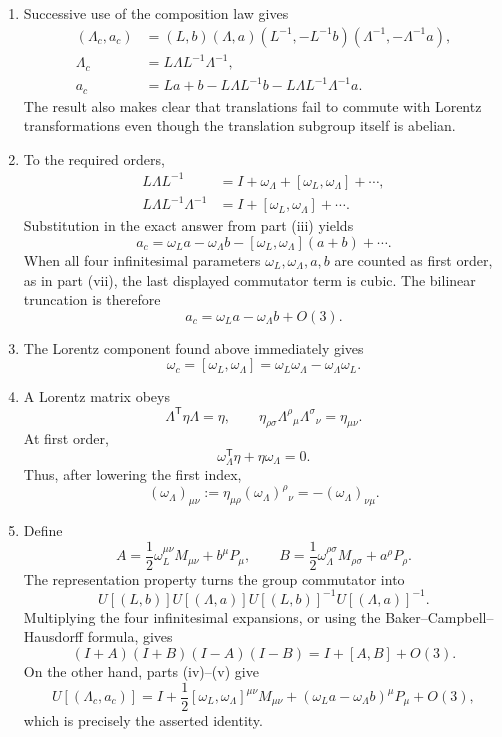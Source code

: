 \begin{enumerate}
\begin{enumerate}
\item[(iii)] Successive use of the composition law gives
\[
\begin{split}
 (\Lambda_c,a_c)
 &=(L,b)(\Lambda,a)(L^{-1},-L^{-1}b)
   (\Lambda^{-1},-\Lambda^{-1}a),\\
 \Lambda_c&=L\Lambda L^{-1}\Lambda^{-1},\\
 a_c&=La+b-L\Lambda L^{-1}b
      -L\Lambda L^{-1}\Lambda^{-1}a.
\end{split}
\]
The result also makes clear that translations fail to commute with
Lorentz transformations even though the translation subgroup itself is
abelian.

\item[(iv)] To the required orders,
\[
\begin{aligned}
 L\Lambda L^{-1}
 &=I+\omega_\Lambda+[\omega_L,\omega_\Lambda]+\cdots,\\
 L\Lambda L^{-1}\Lambda^{-1}
 &=I+[\omega_L,\omega_\Lambda]+\cdots.
\end{aligned}
\]
Substitution in the exact answer from part (iii) yields
\[
 a_c=\omega_La-\omega_\Lambda b
 -[\omega_L,\omega_\Lambda](a+b)+\cdots.
\]
When all four infinitesimal parameters \(\omega_L,\omega_\Lambda,a,b\)
are counted as first order, as in part (vii), the last displayed
commutator term is cubic.  The bilinear truncation is therefore
\[
 a_c=\omega_La-\omega_\Lambda b+O(3).
\]

\item[(v)] The Lorentz component found above immediately gives
\[
 \omega_c=[\omega_L,\omega_\Lambda]
 =\omega_L\omega_\Lambda-\omega_\Lambda\omega_L.
\]

\item[(vi)] A Lorentz matrix obeys
\[
 \Lambda^{\mathsf T}\eta\Lambda=\eta,
 \qquad
 \eta_{\rho\sigma}\Lambda^\rho{}_{\mu}
 \Lambda^\sigma{}_{\nu}=\eta_{\mu\nu}.
\]
At first order,
\[
 \omega_\Lambda^{\mathsf T}\eta+\eta\omega_\Lambda=0.
\]
Thus, after lowering the first index,
\[
 (\omega_\Lambda)_{\mu\nu}
 :=\eta_{\mu\rho}(\omega_\Lambda)^\rho{}_{\nu}
 =-(\omega_\Lambda)_{\nu\mu}.
\]

\item[(vii)] Define
\[
 A=\frac12\omega_L^{\mu\nu}M_{\mu\nu}+b^\mu P_\mu,
 \qquad
 B=\frac12\omega_\Lambda^{\rho\sigma}M_{\rho\sigma}+a^\rho P_\rho.
\]
The representation property turns the group commutator into
\[
 U[(L,b)]U[(\Lambda,a)]U[(L,b)]^{-1}U[(\Lambda,a)]^{-1}.
\]
Multiplying the four infinitesimal expansions, or using the
Baker--Campbell--Hausdorff formula, gives
\[
 (I+A)(I+B)(I-A)(I-B)=I+[A,B]+O(3).
\]
On the other hand, parts (iv)--(v) give
\[
 U[(\Lambda_c,a_c)]
 =I+\frac12[\omega_L,\omega_\Lambda]^{\mu\nu}M_{\mu\nu}
 +(\omega_La-\omega_\Lambda b)^\mu P_\mu+O(3),
\]
which is precisely the asserted identity.


\end{enumerate}
\end{enumerate}
